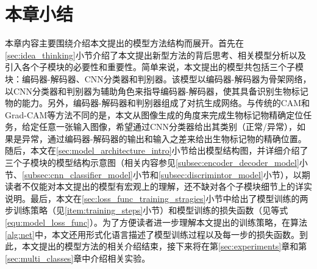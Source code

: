 \section{本章小结}\label{sec:chapter3_summary}
本章内容主要围绕介绍本文提出的模型方法结构而展开。首先在\ref{sec:idea_thinking}小节介绍了本文提出新型方法的背后思考、相关模型分析以及引入各个子模块的必要性和重要性。简单来说，本文提出的模型共包括三个子模块：编码器-解码器、CNN分类器和判别器。该模型以编码器-解码器为骨架网络，以CNN分类器和判别器为辅助角色来指导编码器-解码器，使其具备识别生物标记物的能力。另外，编码器-解码器和判别器组成了对抗生成网络。与传统的CAM和Grad-CAM等方法不同的是，本文从图像生成的角度来完成生物标记物精确定位任务，给定任意一张输入图像，希望通过CNN分类器给出其类别（正常/异常），如果是异常，通过编码器-解码器的输出和输入之差来给出生物标记物的精确位置。随后，本文在\ref{sec:model_architecture_intro}小节给出模型结构图，并详细介绍了三个子模块的模型结构示意图（相关内容参见\ref{subsec:encoder_decoder_model}小节、\ref{subsec:cnn_classifier_model}小节和\ref{subsec:discrimintor_model}小节），以期读者不仅能对本文提出的模型有宏观上的理解，还不缺对各个子模块细节上的详实说明。最后，本文在\ref{sec:loss_func_training_stragies}小节中给出了模型训练的两步训练策略（见\ref{item:training_steps}小节）和模型训练的损失函数（见等式\ref{equ:model_loss_func}）。为了方便读者进一步理解本文提出的训练策略，在算法\ref{alg:net}中，本文还用形式化语言描述了模型训练过程以及每一步的损失函数。到此，本文提出的模型方法的相关介绍结束，接下来将在第\ref{sec:experiments}章和第\ref{sec:multi_classes}章中介绍相关实验。

